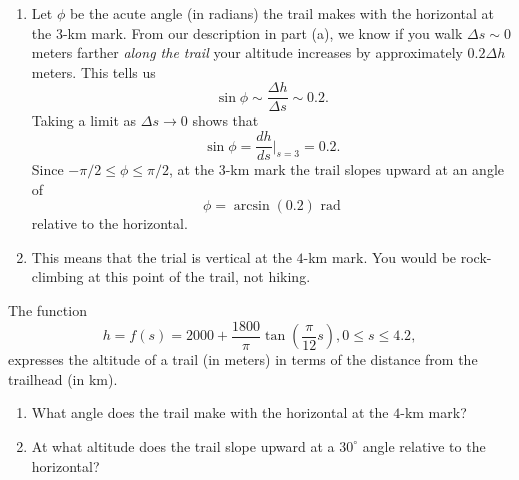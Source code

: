 \documentclass{ximera}
\begin{document}
\begin{question}
\begin{explanation}
\begin{enumerate}
\item Let $\phi$ be the acute angle (in radians) the trail makes with the horizontal at the $3$-km mark. From our description in part (a), we know if you walk $\Delta s\sim 0$ meters farther \emph{along the trail} your altitude increases by approximately $0.2 \Delta h$ meters. This tells us
\[
   \sin\phi \sim \frac{\Delta h}{\Delta s} \sim 0.2 .
\]
Taking a limit as $\Delta s \to 0$ shows that
\[
   \sin \phi = \frac{dh}{ds}\Big|_{s=3} = 0.2 .
\]
Since $-\pi/2 \leq \phi \leq \pi/2$, at the $3$-km mark the trail slopes upward at an angle of
\[
    \phi = \arcsin(0.2) \text{ rad}
\]
relative to the horizontal.

\item This means that the trial is vertical at the $4$-km mark. You would be rock-climbing at this point of the trail, not hiking.
\end{enumerate}
\end{explanation}

\end{question}


\begin{question} \label{Wer3fds}
The function
\[
    h = f\left(s\right)=2000+\frac{1800}{\pi}\tan\left(\frac{\pi}{12}s\right), 0\leq s\leq 4.2,
\]
expresses the altitude of a trail (in meters) in terms of the distance from the trailhead (in km).
\begin{enumerate}
\item What angle does the trail make with the horizontal at the $4$-km mark?
\item At what altitude does the trail slope upward at a $30^\circ$ angle relative to the horizontal?
\end{enumerate}
\end{question}
\end{document}

